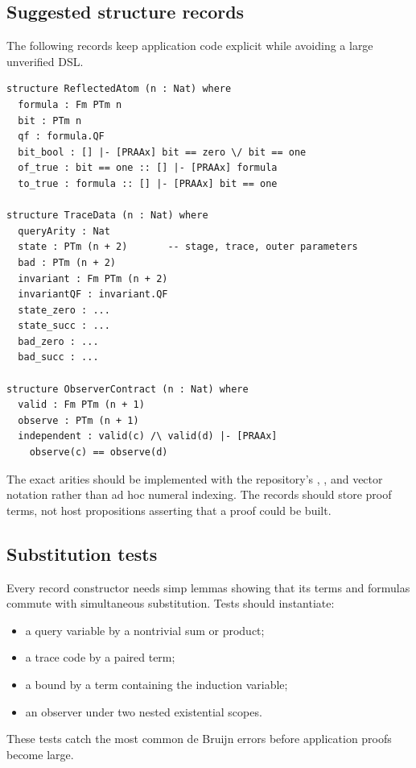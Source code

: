 \subsection{Suggested structure records}

The following records keep application code explicit while avoiding a large
unverified DSL.

\begin{lstlisting}[language=Lean]
structure ReflectedAtom (n : Nat) where
  formula : Fm PTm n
  bit : PTm n
  qf : formula.QF
  bit_bool : [] |- [PRAAx] bit == zero \/ bit == one
  of_true : bit == one :: [] |- [PRAAx] formula
  to_true : formula :: [] |- [PRAAx] bit == one

structure TraceData (n : Nat) where
  queryArity : Nat
  state : PTm (n + 2)       -- stage, trace, outer parameters
  bad : PTm (n + 2)
  invariant : Fm PTm (n + 2)
  invariantQF : invariant.QF
  state_zero : ...
  state_succ : ...
  bad_zero : ...
  bad_succ : ...

structure ObserverContract (n : Nat) where
  valid : Fm PTm (n + 1)
  observe : PTm (n + 1)
  independent : valid(c) /\ valid(d) |- [PRAAx]
    observe(c) == observe(d)
\end{lstlisting}

The exact arities should be implemented with the repository's ,
, and vector notation rather than ad hoc numeral indexing.  The
records should store proof terms, not host propositions asserting that a proof
could be built.

\subsection{Substitution tests}

Every record constructor needs simp lemmas showing that its terms and formulas
commute with simultaneous substitution.  Tests should instantiate:
\begin{itemize}
\item a query variable by a nontrivial sum or product;
\item a trace code by a paired term;
\item a bound by a term containing the induction variable;
\item an observer under two nested existential scopes.
\end{itemize}
These tests catch the most common de Bruijn errors before application proofs
become large.
